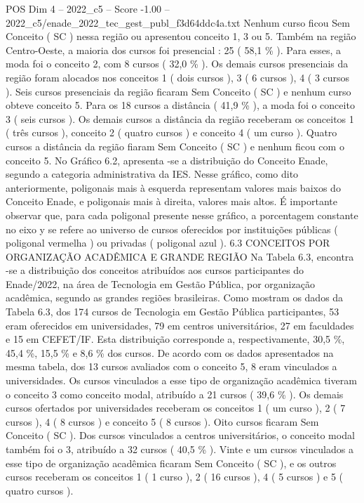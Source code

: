 \begin{textsample}{POS Dim 4 – 2022\_c5 – Score -1.00 – 2022\_c5/enade\_2022\_tec\_gest\_publ\_f3d64ddc4a.txt}
Nenhum curso ficou Sem Conceito ( SC ) nessa região ou apresentou conceito 1, 3 ou 5.
Também na região Centro-Oeste, a maioria dos cursos foi presencial : 25 ( 58,1 \% ).
Para esses, a moda foi o conceito 2, com 8 cursos ( 32,0 \% ).
Os demais cursos presenciais da região foram alocados nos conceitos 1 ( dois cursos ), 3 ( 6 cursos ), 4 ( 3 cursos ).
Seis cursos presenciais da região ficaram Sem Conceito ( SC ) e nenhum curso obteve conceito 5.
Para os 18 cursos a distância ( 41,9 \% ), a moda foi o conceito 3 ( seis cursos ).
Os demais cursos a distância da região receberam os conceitos 1 ( três cursos ), conceito 2 ( quatro cursos ) e conceito 4 ( um curso ).
Quatro cursos a distância da região fiaram Sem Conceito ( SC ) e nenhum ficou com o conceito 5.
No Gráfico 6.2, apresenta -se a distribuição do Conceito Enade, segundo a categoria administrativa da IES.
Nesse gráfico, como dito anteriormente, poligonais mais à esquerda representam valores mais baixos do Conceito Enade, e poligonais mais à direita, valores mais altos.
É importante observar que, para cada poligonal presente nesse gráfico, a porcentagem constante no eixo y se refere ao universo de cursos oferecidos por instituições públicas ( poligonal vermelha ) ou privadas ( poligonal azul ). 6.3 CONCEITOS POR ORGANIZAÇÃO ACADÊMICA E GRANDE REGIÃO Na Tabela 6.3, encontra -se a distribuição dos conceitos atribuídos aos cursos participantes do Enade/2022, na área de Tecnologia em Gestão Pública, por organização acadêmica, segundo as grandes regiões brasileiras.
Como mostram os dados da Tabela 6.3, dos 174 cursos de Tecnologia em Gestão Pública participantes, 53 eram oferecidos em universidades, 79 em centros universitários, 27 em faculdades e 15 em CEFET/IF.
Esta distribuição corresponde a, respectivamente, 30,5 \%, 45,4 \%, 15,5 \% e 8,6 \% dos cursos.
De acordo com os dados apresentados na mesma tabela, dos 13 cursos avaliados com o conceito 5, 8 eram vinculados a universidades.
Os cursos vinculados a esse tipo de organização acadêmica tiveram o conceito 3 como conceito modal, atribuído a 21 cursos ( 39,6 \% ).
Os demais cursos ofertados por universidades receberam os conceitos 1 ( um curso ), 2 ( 7 cursos ), 4 ( 8 cursos ) e conceito 5 ( 8 cursos ).
Oito cursos ficaram Sem Conceito ( SC ).
Dos cursos vinculados a centros universitários, o conceito modal também foi o 3, atribuído a 32 cursos ( 40,5 \% ).
Vinte e um cursos vinculados a esse tipo de organização acadêmica ficaram Sem Conceito ( SC ), e os outros cursos receberam os conceitos 1 ( 1 curso ), 2 ( 16 cursos ), 4 ( 5 cursos ) e 5 ( quatro cursos ).

\end{textsample}
